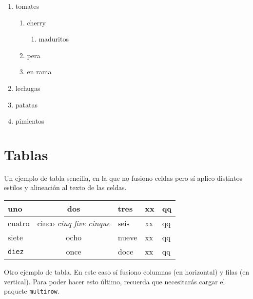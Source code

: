 \documentclass[a4paper]{article}
\begin{document}
\begin{enumerate}

\item tomates
  \begin{enumerate}
  	\item cherry
  	\begin{enumerate}
  		\item maduritos
  	\end{enumerate}
  	\item pera 
  	\item en rama
  \end{enumerate}

\item lechugas

\item patatas

\item pimientos

\end{enumerate}



\section{Tablas}
\label{tablas}

Un ejemplo de tabla sencilla, en la que no fusiono celdas pero sí aplico distintos estilos y alineación al texto de las celdas.

\vspace{0.5cm} %

\begin{tabular}{|| l | c | l | l | l ||}
    \hline
    \hline
   uno & dos & \textbf{tres} & xx & qq \\
    \hline
   cuatro & cinco \textit{cinq five cinque} & seis  & xx & qq \\
    \hline
   siete & ocho & nueve & xx & qq \\ 
    \hline
   \texttt{diez} & once & doce  & xx & qq \\
    \hline
    \hline
 \end{tabular}
 
\vspace{0.5cm} %

Otro ejemplo de tabla. En este caso sí fusiono columnas (en horizontal) y filas (en vertical). Para poder hacer esto último, recuerda que necesitarás cargar el paquete \texttt{multirow}.
\end{document}
